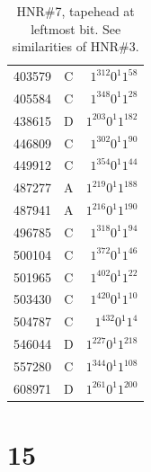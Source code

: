 \documentclass[12pt]{article}
\begin{document}
\begin{small}
\begin{table}[H]
\begin{Parallel}[c]{0.48\textwidth}{0.48\textwidth}
{{\begin{tabular}{rcr}
403579&C&$1^{312}0^{1}1^{58}$\\
405584&C&$1^{348}0^{1}1^{28}$\\
438615&D&$1^{203}0^{1}1^{182}$\\
446809&C&$1^{302}0^{1}1^{90}$\\
449912&C&$1^{354}0^{1}1^{44}$\\
487277&A&$1^{219}0^{1}1^{188}$\\
487941&A&$1^{216}0^{1}1^{190}$\\
496785&C&$1^{318}0^{1}1^{94}$\\
500104&C&$1^{372}0^{1}1^{46}$\\
501965&C&$1^{402}0^{1}1^{22}$\\
503430&C&$1^{420}0^{1}1^{10}$\\
504787&C&$1^{432}0^{1}1^{4}$\\
546044&D&$1^{227}0^{1}1^{218}$\\
557280&C&$1^{344}0^{1}1^{108}$\\
608971&D&$1^{261}0^{1}1^{200}$\\
\end{tabular}}}
\end{Parallel}
\caption{\label{tab:7}HNR\#7, tapehead at leftmost bit. See similarities of HNR\#3.}
\end{table}
\end{small}

\clearpage
{}
{}
\section*{15}
\end{document}
